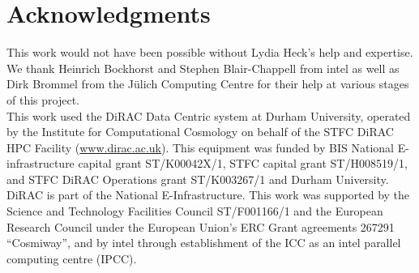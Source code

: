 \documentclass{sig-alternate-05-2015}
\begin{document}
\section{Acknowledgments}
This work would not have been possible without Lydia Heck's help and
expertise. We thank Heinrich Bockhorst and Stephen Blair-Chappell from
{\sc intel} as well as Dirk Brommel from the J\"ulich Computing Centre
for their help at various stages of this project.\\
This work used the DiRAC Data Centric system at Durham University,
operated by the Institute for Computational Cosmology on behalf of the
STFC DiRAC HPC Facility (\url{www.dirac.ac.uk}). This equipment was
funded by BIS National E-infrastructure capital grant ST/K00042X/1,
STFC capital grant ST/H008519/1, and STFC DiRAC Operations grant
ST/K003267/1 and Durham University. DiRAC is part of the National
E-Infrastructure. This work was supported by the Science and
Technology Facilities Council ST/F001166/1 and the European Research
Council under the European Union's ERC Grant agreements 267291
``Cosmiway'', and by {\sc intel} through establishment of the ICC as
an {\sc intel} parallel computing centre (IPCC).

\nocite{*}


\end{document}
